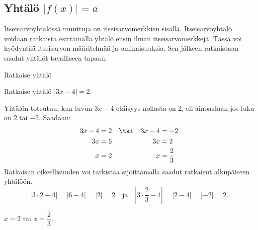 \subsection*{Yhtälö $|f(x)|=a$}


Itseisarvoyhtälössä muuttuja on itseisarvomerkkien sisällä. Itseisarvoyhtälö voidaan ratkaista esittämällä yhtälö ensin ilman itseisarvomerkkejä. Tässä voi hyödyntää itseisarvon määritelmää ja ominaisuuksia. Sen jälkeen ratkaistaan saadut yhtälöt tavalliseen tapaan.


\begin{esimerkki}

Ratkaise yhtälö
\begin{alakohdat}
\end{alakohdat}

\begin{esimratk}
\begin{alakohdat}
\end{alakohdat}
\end{esimratk}
\end{esimerkki}

\begin{esimerkki}
Ratkaise yhtälö $|3x-4|=2$.

\begin{esimratk}
Yhtälön toteutuu, kun luvun $3x-4$ etäisyys nollasta on 2, eli ainoastaan jos luku on $2$ tai $-2$. Saadaan:
\begin{align*}
3x-4 & =2 & & \tai & 3x-4 & =-2 \\
3x & =6 && & 3x & = 2 \\
x & =2 && & x & =\frac{2}{3}
\end{align*}
Ratkaisun oikeellisuuden voi tarkistaa sijoittamalla saadut ratkaisut alkupäiseen yhtälöön.
\[
|3\cdot2-4|=|6-4|=|2|=2 \quad \text{ja} \quad
\left|3\cdot\frac{2}{3}-4\right|=|2-4|=|-2|=2.
\]
\end{esimratk}

\begin{esimvast}
$x=2$ tai $x=\dfrac{2}{3}$.
\end{esimvast}
\end{esimerkki}

